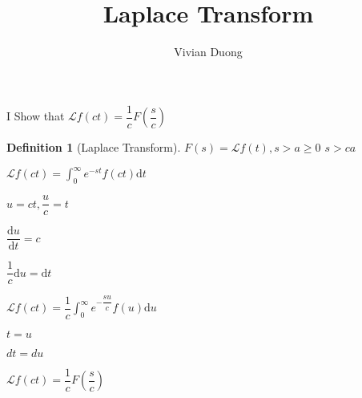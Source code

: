 \documentclass{article}
\title{Laplace Transform}
\author{Vivian Duong}
\date{}
\newtheorem{definition}{Definition}
\begin{document}
I Show that $\mathcal{L} f(ct) = \dfrac{1}{c} F(\dfrac{s}{c})$

\begin{flushright}
\begin{definition}[Laplace Transform]
$F(s) = \mathcal{L}f(t), s>a\geq 0$
$s>ca$
\end{definition}
\end{flushright}

\begin{center}

$\mathcal{L} f(ct) = \int_0^\infty e^{-st} f(ct) \mathrm{d}t$
\end{center}

\begin{flushright}
$u = ct,   \dfrac{u}{c} = t$

$\dfrac{\mathrm{d}u}{\mathrm{d}t} = c$

$\dfrac{1}{c} \mathrm{d}u = \mathrm{d}t$
\end{flushright}
\begin{center}
$\mathcal{L} f(ct) = \dfrac{1}{c} \int_0^\infty e^{-\dfrac{su}{c}}f(u)\mathrm{d}u$

\begin{flushright}
$t = u$

$dt = du$
\end{flushright}

$\mathcal{L} f(ct) = \dfrac{1}{c} F(\dfrac{s}{c})$
\end{center}
\end{document}
